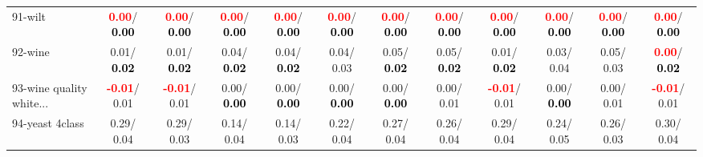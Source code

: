 \begin{table}[h]
\begin{center}
{\begin{tabular}{lc|c|c|c|c|c|c|c|c|c|c}
91-wilt & \textcolor{red}{\textbf{  0.00}}/\textcolor{black}{\textbf{  0.00}} & \textcolor{red}{\textbf{  0.00}}/\textcolor{black}{\textbf{  0.00}} & \textcolor{red}{\textbf{  0.00}}/\textcolor{black}{\textbf{  0.00}} & \textcolor{red}{\textbf{  0.00}}/\textcolor{black}{\textbf{  0.00}} & \textcolor{red}{\textbf{  0.00}}/\textcolor{black}{\textbf{  0.00}} & \textcolor{red}{\textbf{  0.00}}/\textcolor{black}{\textbf{  0.00}} & \textcolor{red}{\textbf{  0.00}}/\textcolor{black}{\textbf{  0.00}} & \textcolor{red}{\textbf{  0.00}}/\textcolor{black}{\textbf{  0.00}} & \textcolor{red}{\textbf{  0.00}}/\textcolor{black}{\textbf{  0.00}} & \textcolor{red}{\textbf{  0.00}}/\textcolor{black}{\textbf{  0.00}} & \textcolor{red}{\textbf{  0.00}}/\textcolor{black}{\textbf{  0.00}} \\
92-wine &   0.01/\textcolor{black}{\textbf{  0.02}} &   0.01/\textcolor{black}{\textbf{  0.02}} &   0.04/\textcolor{black}{\textbf{  0.02}} &   0.04/\textcolor{black}{\textbf{  0.02}} &   0.04/  0.03 &   0.05/\textcolor{black}{\textbf{  0.02}} &   0.05/\textcolor{black}{\textbf{  0.02}} &   0.01/\textcolor{black}{\textbf{  0.02}} &   0.03/  0.04 &   0.05/  0.03 & \textcolor{red}{\textbf{  0.00}}/\textcolor{black}{\textbf{  0.02}} \\ \hline
93-wine quality white... & \textcolor{red}{\textbf{ -0.01}}/  0.01 & \textcolor{red}{\textbf{ -0.01}}/  0.01 &   0.00/\textcolor{black}{\textbf{  0.00}} &   0.00/\textcolor{black}{\textbf{  0.00}} &   0.00/\textcolor{black}{\textbf{  0.00}} &   0.00/\textcolor{black}{\textbf{  0.00}} &   0.00/  0.01 & \textcolor{red}{\textbf{ -0.01}}/  0.01 &   0.00/\textcolor{black}{\textbf{  0.00}} &   0.00/  0.01 & \textcolor{red}{\textbf{ -0.01}}/  0.01 \\
94-yeast 4class &   0.29/  0.04 &   0.29/  0.03 &   0.14/  0.04 &   0.14/  0.03 &   0.22/  0.04 &   0.27/  0.04 &   0.26/  0.04 &   0.29/  0.04 &   0.24/  0.05 &   0.26/  0.03 &   0.30/  0.04 \\\end{tabular}}\label{stratsALCKappa2aSVM}
\end{center}
\end{table}
